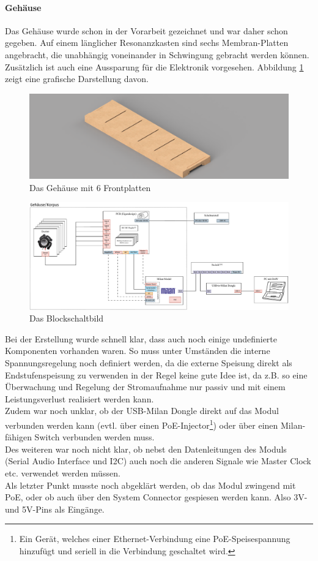 \paragraph{Gehäuse}Das Gehäuse wurde schon in der Vorarbeit gezeichnet und war daher schon gegeben. Auf einem länglicher Resonanzkasten sind sechs Membran-Platten angebracht, die unabhängig voneinander in Schwingung gebracht werden können. Zusätzlich ist auch eine Aussparung für die Elektronik vorgesehen. Abbildung \ref{pics:render_box} zeigt eine grafische Darstellung davon.
\begin{figure}[H]
	\centering
	\includegraphics[width=\textwidth]{pictures/Nathophone_2025-Sep-29_07-57-22AM-000_CustomizedView2892546826.png}
	\caption{Das Gehäuse mit 6 Frontplatten}
	\label{pics:render_box}
\end{figure}
\begin{figure}[H]
	\centering
	\includegraphics[width=\textwidth]{pictures/blockschaltbild.pdf}
	\caption{Das Blockschaltbild}
	\label{pics:blockschaltbild}
\end{figure}
Bei der Erstellung wurde schnell klar, dass auch noch einige undefinierte Komponenten vorhanden waren. So muss unter Umständen die interne Spannungsregelung noch definiert werden, da die externe Speisung direkt als Endstufenspeisung zu verwenden in der Regel keine gute Idee ist, da z.B. so eine Überwachung und Regelung der Stromaufnahme nur passiv und mit einem Leistungsverlust realisiert werden kann.
\\Zudem war noch unklar, ob der USB-Milan Dongle direkt auf das Modul verbunden werden kann (evtl. über einen PoE-Injector\footnote{Ein Gerät, welches einer Ethernet-Verbindung eine PoE-Speisespannung hinzufügt und seriell in die Verbindung geschaltet wird.}) oder über einen Milan-fähigen Switch verbunden werden muss.
\\Des weiteren war noch nicht klar, ob nebst den Datenleitungen des Moduls (Serial Audio Interface und I2C) auch noch die anderen Signale wie Master Clock etc. verwendet werden müssen.
\\Als letzter Punkt musste noch abgeklärt werden, ob das Modul zwingend mit PoE, oder ob auch über den System Connector gespiesen werden kann. Also 3V- und 5V-Pins als Eingänge.